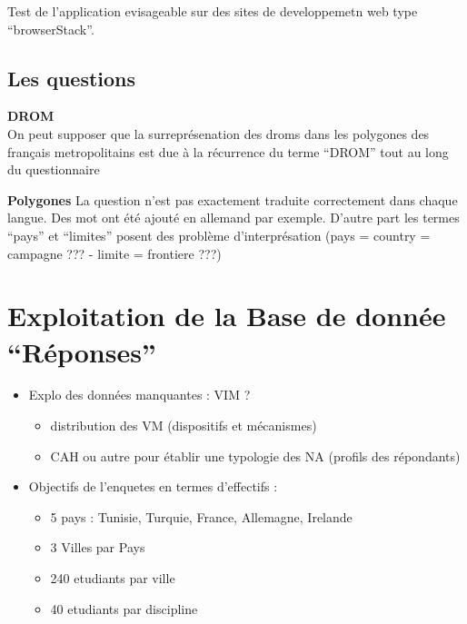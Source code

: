 \documentclass[
  a4paper,
]{scrbook}
\providecommand{\tightlist}{%
  \setlength{\itemsep}{0pt}\setlength{\parskip}{0pt}}\usepackage{longtable,booktabs,array}
\begin{document}
Test de l'application evisageable sur des sites de developpemetn web
type ``browserStack''.

\hypertarget{les-questions}{%
\subsection{Les questions}\label{les-questions}}

\textbf{DROM}\\
On peut supposer que la surreprésenation des droms dans les polygones
des français metropolitains est due à la récurrence du terme ``DROM''
tout au long du questionnaire

\textbf{Polygones} La question n'est pas exactement traduite
correctement dans chaque langue. Des mot ont été ajouté en allemand par
exemple. D'autre part les termes ``pays'' et ``limites'' posent des
problème d'interprésation (pays = country = campagne ??? - limite =
frontiere ???)

\hypertarget{exploitation-de-la-base-de-donnuxe9e-ruxe9ponses}{%
\section{Exploitation de la Base de donnée
``Réponses''}\label{exploitation-de-la-base-de-donnuxe9e-ruxe9ponses}}

\begin{itemize}
\tightlist
\item
  Explo des données manquantes : VIM ?

  \begin{itemize}
  \tightlist
  \item
    distribution des VM (dispositifs et mécanismes)
  \item
    CAH ou autre pour établir une typologie des NA (profils des
    répondants)
  \end{itemize}
\item
  Objectifs de l'enquetes en termes d'effectifs :

  \begin{itemize}
  \tightlist
  \item
    5 pays : Tunisie, Turquie, France, Allemagne, Irelande
  \item
    3 Villes par Pays
  \item
    240 etudiants par ville
  \item
    40 etudiants par discipline
  \end{itemize}
\end{itemize}
\end{document}
